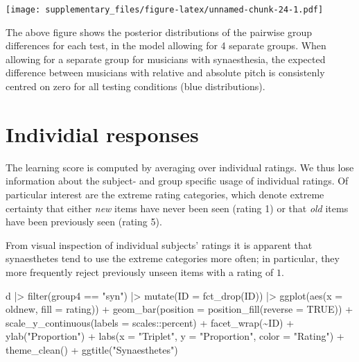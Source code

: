 \documentclass[
  man,floatsintext]{apa7}
\newenvironment{Shaded}{\begin{snugshade}}{\end{snugshade}}
\newcommand{\AttributeTok}[1]{\textcolor[rgb]{0.77,0.63,0.00}{#1}}
\newcommand{\ConstantTok}[1]{\textcolor[rgb]{0.00,0.00,0.00}{#1}}
\newcommand{\FunctionTok}[1]{\textcolor[rgb]{0.00,0.00,0.00}{#1}}
\newcommand{\NormalTok}[1]{#1}
\newcommand{\SpecialCharTok}[1]{\textcolor[rgb]{0.00,0.00,0.00}{#1}}
\newcommand{\StringTok}[1]{\textcolor[rgb]{0.31,0.60,0.02}{#1}}
\begin{document}
\texttt{[image: supplementary\_files/figure-latex/unnamed-chunk-24-1.pdf]}

The above figure shows the posterior distributions of the pairwise group differences for each test, in the model allowing for 4 separate groups. When allowing for a separate group for musicians with synaesthesia, the expected difference between musicians with relative and absolute pitch is consistenly centred on zero for all testing conditions (blue distributions).

\hypertarget{individial-responses}{%
\section{Individial responses}\label{individial-responses}}

The learning score is computed by averaging over individual ratings. We thus lose information about the subject- and group specific usage of individual ratings. Of particular interest are the extreme rating categories, which denote extreme certainty that either \emph{new} items have never been seen (rating 1) or that \emph{old} items have been previously seen (rating 5).

From visual inspection of individual subjects' ratings it is apparent that synaesthetes tend to use the extreme categories more often; in particular, they more frequently reject previously unseen items with a rating of \(1\).

\begin{Shaded}
\begin{Highlighting}[]
\NormalTok{d }\SpecialCharTok{|\textgreater{}}
  \FunctionTok{filter}\NormalTok{(group4 }\SpecialCharTok{==} \StringTok{"syn"}\NormalTok{) }\SpecialCharTok{|\textgreater{}}
  \FunctionTok{mutate}\NormalTok{(}\AttributeTok{ID =} \FunctionTok{fct\_drop}\NormalTok{(ID)) }\SpecialCharTok{|\textgreater{}}
  \FunctionTok{ggplot}\NormalTok{(}\FunctionTok{aes}\NormalTok{(}\AttributeTok{x =}\NormalTok{ oldnew, }\AttributeTok{fill =}\NormalTok{ rating)) }\SpecialCharTok{+}
  \FunctionTok{geom\_bar}\NormalTok{(}\AttributeTok{position =} \FunctionTok{position\_fill}\NormalTok{(}\AttributeTok{reverse =} \ConstantTok{TRUE}\NormalTok{)) }\SpecialCharTok{+}
  \FunctionTok{scale\_y\_continuous}\NormalTok{(}\AttributeTok{labels =}\NormalTok{ scales}\SpecialCharTok{::}\NormalTok{percent) }\SpecialCharTok{+}
  \FunctionTok{facet\_wrap}\NormalTok{(}\SpecialCharTok{\textasciitilde{}}\NormalTok{ID) }\SpecialCharTok{+}
  \FunctionTok{ylab}\NormalTok{(}\StringTok{"Proportion"}\NormalTok{) }\SpecialCharTok{+}
  \FunctionTok{labs}\NormalTok{(}\AttributeTok{x =} \StringTok{"Triplet"}\NormalTok{, }\AttributeTok{y =} \StringTok{"Proportion"}\NormalTok{, }\AttributeTok{color =} \StringTok{"Rating"}\NormalTok{) }\SpecialCharTok{+}
  \FunctionTok{theme\_clean}\NormalTok{() }\SpecialCharTok{+}
  \FunctionTok{ggtitle}\NormalTok{(}\StringTok{"Synaesthetes"}\NormalTok{)}
\end{Highlighting}
\end{Shaded}
\end{document}
